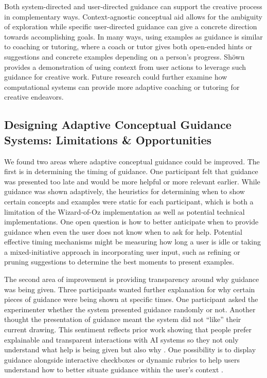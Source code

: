 Both system-directed and user-directed guidance can support the creative process in complementary ways. Context-agnostic conceptual aid allows for the ambiguity of exploration while specific user-directed guidance can give a concrete direction towards accomplishing goals. In many ways, using examples as guidance is similar to coaching or tutoring, where a coach or tutor gives both open-ended hints or suggestions and concrete examples depending on a person's progress. Sh{\"o}wn provides a demonstration of using context from user actions to leverage such guidance for creative work. Future research could further examine how computational systems can provide more adaptive coaching or tutoring for creative endeavors.

\subsection{Designing Adaptive Conceptual Guidance Systems: Limitations \& Opportunities}
We found two areas where adaptive conceptual guidance could be improved. The first is in determining the timing of guidance. One participant felt that guidance was presented too late and would be more helpful or more relevant earlier. While guidance was shown adaptively, the heuristics for determining when to show certain concepts and examples were static for each participant, which is both a limitation of the Wizard-of-Oz implementation as well as potential technical implementations. One open question is how to better anticipate when to provide guidance when even the user does not know when to ask for help. Potential effective timing mechanisms might be measuring how long a user is idle \cite{chan2018best,Siangliulue} or taking a mixed-initiative approach in incorporating user input, such as refining or pruning suggestions \cite{kandel2011wrangler} to determine the best moments to present examples. 

The second area of improvement is providing transparency around why guidance was being given. Three participants wanted further explanation for why certain pieces of guidance were being shown at specific times. One participant asked the experimenter whether the system presented guidance randomly or not. Another thought the presentation of guidance meant the system did not ``like'' their current drawing. This sentiment reflects prior work showing that people prefer explainable and transparent interactions with AI systems so they not only understand what help is being given but also why \cite{Amershi,Heer2019,Oh2018}. One possibility is to display guidance alongside interactive checkboxes or dynamic rubrics to help users understand how to better situate guidance within the user’s context \cite{Bharadwaj,ngoon2018interactive}.

